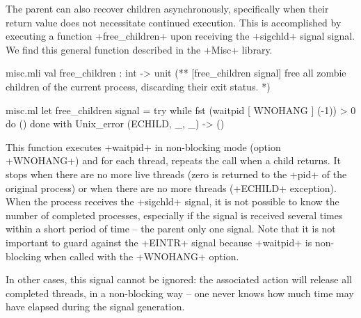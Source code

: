 \begin{example}
The parent can also recover children asynchronously, specifically
when their return value does not necessitate continued execution.
This is accomplished by executing a function \ml+free_children+ upon
receiving the \ml+sigchld+ signal signal.  We find this general function 
described in the \ml+Misc+ library.


%
\begin{codefile}{misc.mli}
val free_children : int -> unit
(** [free_children signal] free all zombie children of the current process, 
    discarding their exit status. *)
\end{codefile}
%
\begin{listingcodefile}{misc.ml}
let free_children signal = 
  try while fst (waitpid [ WNOHANG ] (-1)) > 0 do () done 
  with Unix_error (ECHILD, _, _) -> ()
\end{listingcodefile}
%
This function executes \ml+waitpid+ in non-blocking mode 
(option \ml+WNOHANG+) and for each thread, repeats
the call when a child returns.  It stops when there are
no more live threads (zero is returned to the \ml+pid+ of the
original process) or when there are no more threads
(\ml+ECHILD+ exception).  When the process receives the \ml+sigchld+ 
signal, it is not possible to know the number of completed processes, 
especially if the signal is received several times within a short 
period of time -- the parent  only one signal.  Note that it 
is not important to guard against the \ml+EINTR+ signal because 
\ml+waitpid+ is non-blocking when called with the \ml+WNOHANG+ option.

In other cases, this signal cannot be ignored: the associated 
action will release all completed threads, in a non-blocking way --
one never knows how much time may have elapsed during the signal 
generation.
\end{example}

